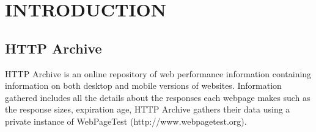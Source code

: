 \chapter{INTRODUCTION}
\label{ch:introduction}

\section*{HTTP Archive}
HTTP Archive is an online repository of web performance information containing information on both desktop and mobile versions of websites. Information gathered includes all the details about the responses each webpage makes such as the response sizes, expiration age, HTTP Archive gathers their data using a private instance of WebPageTest (http://www.webpagetest.org).